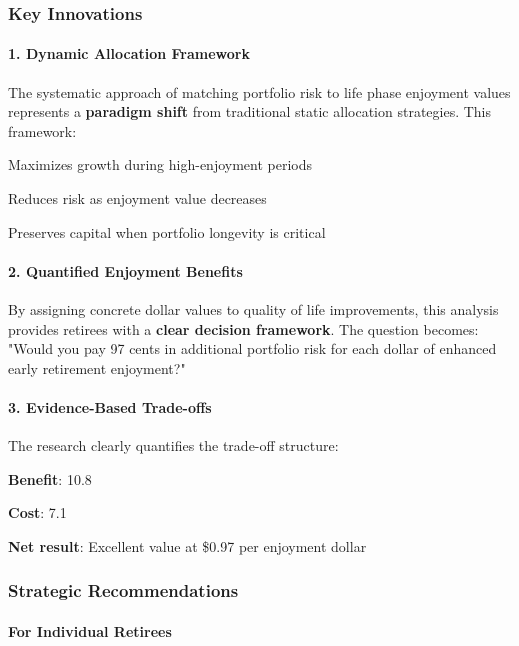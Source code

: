 \documentclass[11pt,letterpaper]{article}
\begin{document}
{{{{{{{{{{{\subsubsection{Key Innovations}


\paragraph{1. Dynamic Allocation Framework}

The systematic approach of matching portfolio risk to life phase enjoyment values represents a \textbf{paradigm shift} from traditional static allocation strategies. This framework:

\item Maximizes growth during high-enjoyment periods
\item Reduces risk as enjoyment value decreases
\item Preserves capital when portfolio longevity is critical

\paragraph{2. Quantified Enjoyment Benefits}

By assigning concrete dollar values to quality of life improvements, this analysis provides retirees with a \textbf{clear decision framework}. The question becomes: "Would you pay 97 cents in additional portfolio risk for each dollar of enhanced early retirement enjoyment?"


\paragraph{3. Evidence-Based Trade-offs}

The research clearly quantifies the trade-off structure:

\item \textbf{Benefit}: 10.8%
\item \textbf{Cost}: 7.1%
\item \textbf{Net result}: Excellent value at \$0.97 per enjoyment dollar

\subsubsection{Strategic Recommendations}


\paragraph{For Individual Retirees}

}}}}}}}}}}}
\end{document}
